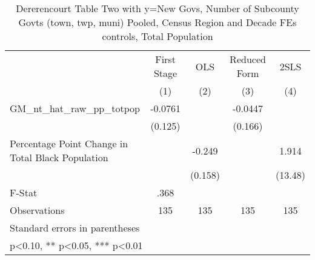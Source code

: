 \begin{table}[htbp]\centering
\def\sym#1{\ifmmode^{#1}\else\(^{#1}\)\fi}
\caption{Dererencourt Table Two with y=New Govs, Number of Subcounty Govts (town, twp, muni)  Pooled, Census Region and Decade FEs controls, Total Population}
\begin{tabular}{l*{4}{c}}
\toprule
                    & First Stage   &         OLS   &Reduced Form   &        2SLS   \\
                    &\multicolumn{1}{c}{(1)}   &\multicolumn{1}{c}{(2)}   &\multicolumn{1}{c}{(3)}   &\multicolumn{1}{c}{(4)}   \\
\midrule
GM\_nt\_hat\_raw\_pp\_totpop&     -0.0761   &               &     -0.0447   &               \\
                    &     (0.125)   &               &     (0.166)   &               \\
\addlinespace
Percentage Point Change in Total Black Population&               &      -0.249   &               &       1.914   \\
                    &               &     (0.158)   &               &     (13.48)   \\
\midrule
F-Stat              &        .368   &               &               &               \\
Observations        &         135   &         135   &         135   &         135   \\
\bottomrule
\multicolumn{5}{l}{\footnotesize Standard errors in parentheses}\\
\multicolumn{5}{l}{\footnotesize * p<0.10, ** p<0.05, *** p<0.01}\\
\end{tabular}
\end{table}
